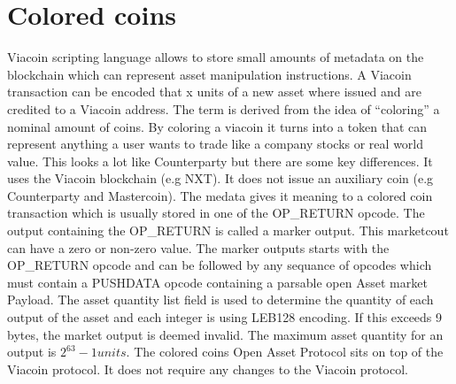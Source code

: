 \documentclass{article}
\begin{document}
\section{Colored coins}\label{Colored coins}
Viacoin scripting language allows to store small amounts of metadata on the
blockchain which can represent asset manipulation instructions. A Viacoin
transaction can be encoded that x units of a new asset where issued and are
credited to a Viacoin address. The term is derived from the idea of “coloring” a
nominal amount of coins.
By coloring a viacoin it turns into a token that can represent anything a user
wants to trade like a company stocks or real world value. This looks a lot like
Counterparty but there are some key differences. It uses the Viacoin blockchain
(e.g NXT).
\newline \newline \noindent
It does not issue an auxiliary coin (e.g Counterparty and Mastercoin).
The medata gives it meaning to a \cite{coloredCoins}colored coin transaction which is usually stored
in one of the OP\_RETURN opcode. The output containing the OP\_RETURN is called
a marker output. This marketcout can have a zero or non-zero value. The marker
outputs starts with the OP\_RETURN opcode and can be followed by any sequance
of opcodes which must contain a PUSHDATA opcode containing a parsable open
Asset market Payload.
The asset quantity list field is used to determine the quantity of each output of
the asset and each integer is using LEB128 encoding. If this exceeds 9 bytes, the
market output is deemed invalid. The maximum asset quantity for an output is
$2^63 - 1 units$.
The colored coins \cite{openAsset}Open Asset Protocol sits on top of the Viacoin protocol. It does
not require any changes to the Viacoin protocol.
\end{document}

